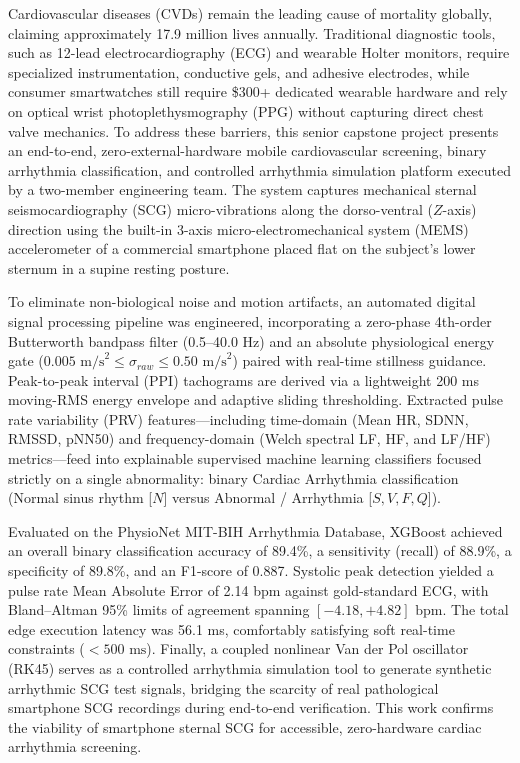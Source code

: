 Cardiovascular diseases (CVDs) remain the leading cause of mortality globally, claiming approximately 17.9 million lives annually. Traditional diagnostic tools, such as 12-lead electrocardiography (ECG) and wearable Holter monitors, require specialized instrumentation, conductive gels, and adhesive electrodes, while consumer smartwatches still require \$300+ dedicated wearable hardware and rely on optical wrist photoplethysmography (PPG) without capturing direct chest valve mechanics. To address these barriers, this senior capstone project presents an end-to-end, zero-external-hardware mobile cardiovascular screening, binary arrhythmia classification, and controlled arrhythmia simulation platform executed by a two-member engineering team. The system captures mechanical sternal seismocardiography (SCG) micro-vibrations along the dorso-ventral ($Z$-axis) direction using the built-in 3-axis micro-electromechanical system (MEMS) accelerometer of a commercial smartphone placed flat on the subject's lower sternum in a supine resting posture.

To eliminate non-biological noise and motion artifacts, an automated digital signal processing pipeline was engineered, incorporating a zero-phase 4th-order Butterworth bandpass filter (0.5--40.0 Hz) and an absolute physiological energy gate ($0.005\text{ m/s}^2 \le \sigma_{raw} \le 0.50\text{ m/s}^2$) paired with real-time stillness guidance. Peak-to-peak interval (PPI) tachograms are derived via a lightweight 200 ms moving-RMS energy envelope and adaptive sliding thresholding. Extracted pulse rate variability (PRV) features—including time-domain (Mean HR, SDNN, RMSSD, pNN50) and frequency-domain (Welch spectral LF, HF, and LF/HF) metrics—feed into explainable supervised machine learning classifiers focused strictly on a single abnormality: binary Cardiac Arrhythmia classification (Normal sinus rhythm [$N$] versus Abnormal / Arrhythmia [$S, V, F, Q$]).

Evaluated on the PhysioNet MIT-BIH Arrhythmia Database, XGBoost achieved an overall binary classification accuracy of 89.4\%, a sensitivity (recall) of 88.9\%, a specificity of 89.8\%, and an F1-score of 0.887. Systolic peak detection yielded a pulse rate Mean Absolute Error of 2.14 bpm against gold-standard ECG, with Bland--Altman 95\% limits of agreement spanning $[-4.18, +4.82]\text{ bpm}$. The total edge execution latency was 56.1 ms, comfortably satisfying soft real-time constraints ($<500\text{ ms}$). Finally, a coupled nonlinear Van der Pol oscillator (RK45) serves as a controlled arrhythmia simulation tool to generate synthetic arrhythmic SCG test signals, bridging the scarcity of real pathological smartphone SCG recordings during end-to-end verification. This work confirms the viability of smartphone sternal SCG for accessible, zero-hardware cardiac arrhythmia screening.
